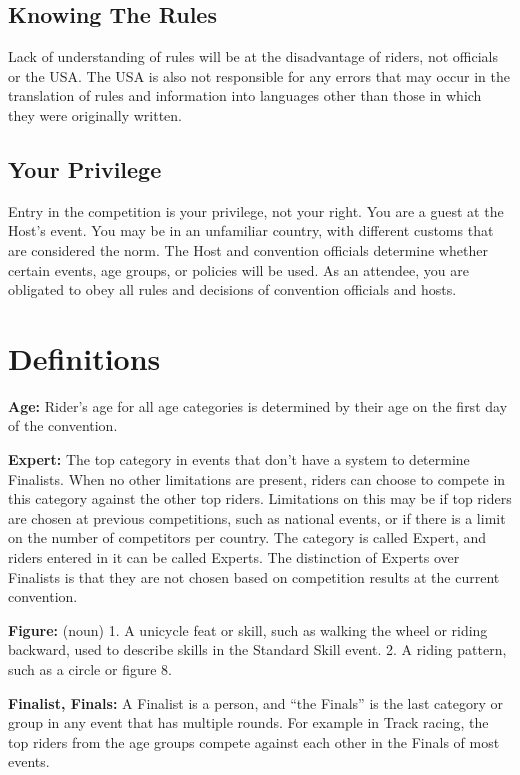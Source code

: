 \section{Knowing The Rules}
Lack of understanding of rules will be at the disadvantage of riders, not officials or the USA.
The USA is also not responsible for any errors that may occur in the translation of rules and information into languages other than those in which they were originally written.

\section{Your Privilege}
Entry in the competition is your privilege, not your right.
You are a guest at the Host's event.
You may be in an unfamiliar country, with different customs that are considered the norm.
The Host and convention officials determine whether certain events, age groups, or policies will be used.
As an attendee, you are obligated to obey all rules and decisions of convention officials and hosts.

\chapter{Definitions \label{chap:general_definitions}}
\textbf{Age:} Rider's age for all age categories is determined by their age on the first day of the convention.

\textbf{Expert:} The top category in events that don't have a system to determine Finalists.
When no other limitations are present, riders can choose to compete in this category against the other top riders.
Limitations on this may be if top riders are chosen at previous competitions, such as national events, or if there is a limit on the number of competitors per country.
The category is called Expert, and riders entered in it can be called Experts.
The distinction of Experts over Finalists is that they are not chosen based on competition results at the current convention.

\textbf{Figure:} (noun) 1. A unicycle feat or skill, such as walking the wheel or riding backward, used to describe skills in the Standard Skill event.
2. A riding pattern, such as a circle or figure 8.

\textbf{Finalist, Finals:} A Finalist is a person, and ``the Finals'' is the last category or group in any event that has multiple rounds.
For example in Track racing, the top riders from the age groups compete against each other in the Finals of most events.

